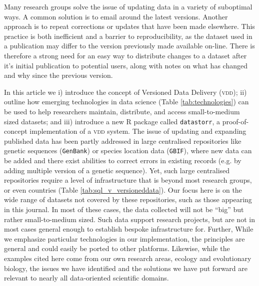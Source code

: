 \documentclass[a4paper,11pt]{article}
\begin{document}
Many research groups solve the issue of updating data in a variety of suboptimal ways. A common solution is to email around the latest versions. Another approach is to repeat corrections or updates that have been made elsewhere. This practice is both inefficient and a barrier to reproducibility, as the dataset used in a publication may differ to the version previously made available on-line. There is therefore a strong need for an easy way to distribute changes to a dataset after it's initial publication to potential users, along with notes on what has changed and why since the previous version.

In this article we i) introduce the concept of Versioned Data Delivery (\textsc{vdd}); ii) outline how emerging technologies in data science (Table \ref{tab:technologies}) can be used to help researchers maintain, distribute, and access small-to-medium sized datasets; and iii) introduce a new \textsc{R} package called \texttt{datastorr}, a proof-of-concept implementation of a \textsc{vdd} system. The issue of updating and expanding published data has been partly addressed in large centralised repositories like genetic sequences (\texttt{GenBank}) or species location data (\texttt{GBIF}), where new data can be added and there exist abilities to correct errors in existing records (e.g. by adding multiple version of a genetic sequence). Yet, such large centralised repositories require a level of infrastructure that is beyond most research groups, or even countries (Table \ref{tab:sql_v_versioneddata}). Our focus here is on the wide range of datasets not covered by these repositories, such as those appearing in this journal. In most of these cases, the data
collected will not be ``big'' but rather small-to-medium sized. Such data
support research projects, but are not in most cases general enough to
establish bespoke infrastructure for. Further, While we emphasize particular technologies in our implementation, the principles are general and could easily be ported to other platforms. Likewise, while the examples cited here come from our own research areas, ecology and evolutionary biology, the issues we have identified and the solutions we have put forward are relevant to nearly all data-oriented scientific domains.


\end{document}
